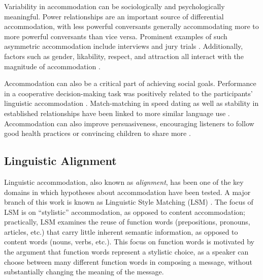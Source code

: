 \documentclass{acm_proc_article-sp}
\begin{document}
Variability in accommodation can be sociologically and psychologically meaningful.  Power relationships are an important source of differential accommodation, with less powerful conversants generally accommodating more to more powerful conversants than vice versa. Prominent examples of such asymmetric accommodation include interviews and jury trials \cite{WillemynsEtAl1997,Gnisci2005,DNMEtAl2012}.  Additionally, factors such as gender, likability, respect, and attraction all interact with the magnitude of accommodation \cite{BilousKrauss1988,Natale1975}. %

Accommodation can also be a critical part of achieving social goals.  Performance in a cooperative decision-making task was positively related to the participants' linguistic accommodation \cite{FusaroliEtAl2012}.  Match-matching in speed dating as well as stability in established relationships have been linked to more similar language use \cite{IrelandEtAl2011}.  Accommodation can also improve persuasiveness, encouraging listeners to follow good health practices \cite{KlineCeropski1984} or convincing children to share more \cite{BurlesonFennelly1981}.

\subsection{Linguistic Alignment}

Linguistic accommodation, also known as \emph{alignment}, has been one of the key domains in which hypotheses about accommodation have been tested. A major branch of this work is known as Linguistic Style Matching (LSM) \cite{NiederhofferPennebaker2002,IrelandEtAl2011}.  The focus of LSM is on ``stylistic'' accommodation, as opposed to content accommodation; practically, LSM examines the reuse of function words (prepositions, pronouns, articles, etc.) that carry little inherent semantic information, as opposed to content words (nouns, verbs, etc.). This focus on function words is motivated by the argument that function words represent a stylistic choice, as a speaker can choose between many different function words in composing a message, without substantially changing the meaning of the message.  
\end{document}
